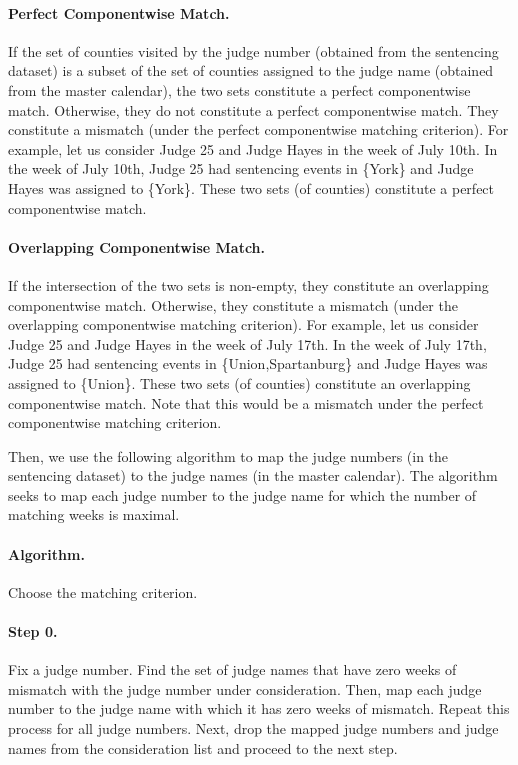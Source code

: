 \documentclass[11pt]{article}
\theoremstyle{ModifiedStyle}
\begin{document}
  	\paragraph{Perfect Componentwise Match.} If the set of counties visited by the judge number (obtained from the sentencing dataset) is a subset of the set of counties assigned to the judge name (obtained from the master calendar), the two sets constitute a perfect componentwise match. Otherwise, they do not constitute a perfect componentwise match. They constitute a mismatch (under the perfect componentwise matching criterion). For example, let us consider Judge 25 and Judge Hayes in the week of July 10th. In the week of July 10th, Judge 25 had sentencing events in \{York\} and Judge Hayes was assigned to \{York\}. These two sets (of counties) constitute a perfect componentwise match.
  	\vspace{-3mm}
  	\paragraph{Overlapping Componentwise Match.} If the intersection of the two sets is non-empty, they constitute an overlapping componentwise match. Otherwise, they constitute a mismatch (under the overlapping componentwise matching criterion). For example, let us consider Judge 25 and Judge Hayes in the week of July 17th. In the week of July 17th, Judge 25 had sentencing events in \{Union,Spartanburg\} and Judge Hayes was assigned to \{Union\}. These two sets (of counties) constitute an overlapping componentwise match. Note that this would be a mismatch under the perfect componentwise matching criterion.

  	Then, we use the following algorithm to map the judge numbers (in the sentencing dataset) to the judge names (in the master calendar). The algorithm seeks to map each judge number to the judge name for which the number of matching weeks is maximal.
  	\vspace{-3mm}
  	\paragraph{Algorithm.} Choose the matching criterion.
  	\vspace{-5mm}
  	\paragraph{Step 0.} Fix a judge number. Find the set of judge names that have zero weeks of mismatch with the judge number under consideration. Then, map each judge number to the judge name with which it has zero weeks of mismatch. Repeat this process for all judge numbers. Next, drop the mapped judge numbers and judge names from the consideration list and proceed to the next step.
  	\vspace{-5mm}
\end{document}
